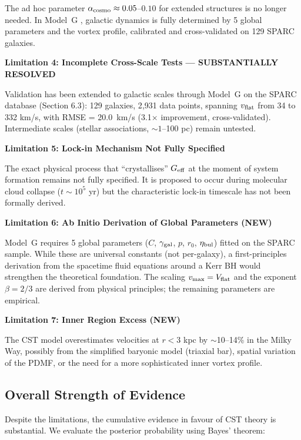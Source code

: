 \documentclass[10pt,a4paper]{article}
\begin{document}
The ad hoc parameter \(\alpha_{\rm cosmo} \approx 0.05\)--\(0.10\) for extended structures is no longer needed. In Model~G \cite{Mo2010}, galactic dynamics is fully determined by 5 global parameters and the vortex profile, calibrated and cross-validated on 129 SPARC galaxies.

\textbf{Limitation 4: Incomplete Cross-Scale Tests --- SUBSTANTIALLY RESOLVED}

Validation has been extended to galactic scales through Model~G on the SPARC database (Section 6.3): 129 galaxies, 2{,}931 data points, spanning \(v_{\rm flat}\) from 34 to 332 km/s, with RMSE = 20.0~km/s (3.1\(\times\) improvement, cross-validated). Intermediate scales (stellar associations, \(\sim 1\)--100 pc) remain untested.

\textbf{Limitation 5: Lock-in Mechanism Not Fully Specified}

The exact physical process that ``crystallises'' \(G_{\rm eff}\) at the
moment of system formation remains not fully specified. It is proposed
to occur during molecular cloud collapse (\(t \sim 10^5\) yr) but the
characteristic lock-in timescale has not been formally derived.

\textbf{Limitation 6: Ab Initio Derivation of Global Parameters (NEW)}

Model~G requires 5 global parameters (\(C\), \(\gamma_{\rm gal}\), \(p\), \(r_0\), \(\eta_{\rm bul}\)) fitted on the SPARC sample. While these are universal constants (not per-galaxy), a first-principles derivation from the spacetime fluid equations around a Kerr BH would strengthen the theoretical foundation. The scaling \(v_{\rm max} = V_{\rm flat}\) and the exponent \(\beta = 2/3\) are derived from physical principles; the remaining parameters are empirical.

\textbf{Limitation 7: Inner Region Excess (NEW)}

The CST model overestimates velocities at \(r < 3\) kpc by \(\sim\)10--14\% in the Milky Way, possibly from the simplified baryonic model (triaxial bar), spatial variation of the PDMF, or the need for a more sophisticated inner vortex profile.

\subsection{Overall Strength of
Evidence}\label{overall-strength-of-evidence}

Despite the limitations, the cumulative evidence in favour of CST theory
is substantial. We evaluate the posterior probability using Bayes'
theorem:
\end{document}
